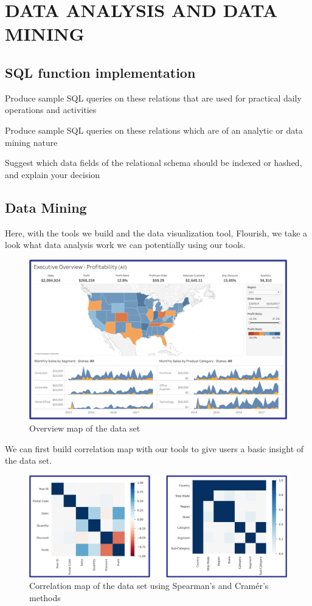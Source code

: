 \section{DATA ANALYSIS AND DATA MINING}
\label{section:analysis}
\subsection{SQL function implementation}
\label{sect:sub-title}
Produce sample SQL queries on these relations that are used for practical daily
operations and activities 

Produce sample SQL queries on these relations which are of an analytic or data 
mining nature

Suggest which data fields of the relational schema should be indexed or 
hashed, and explain your decision

\subsection{Data Mining}
\label{sect:sub-title}
	Here, with the tools we build and the data visualization tool, Flourish, we take a look what data analysis work we can potentially using our tools.

\begin{figure}[H]
    \centering
    \includegraphics[width=\columnwidth]{images/DataMap.png}
    \caption[Short text]{Overview map of the data set}
    \label{fig:Overview}
\end{figure}
We can first build correlation map with our tools to give users a basic insight of the data set.

\begin{figure}[H]
    \centering
    \includegraphics[width=\columnwidth]{images/correlation.png}
    \caption[Short text]{Correlation map of the data set using Spearman's and Cramér's methods}
    \label{fig:Correlation}
\end{figure}

